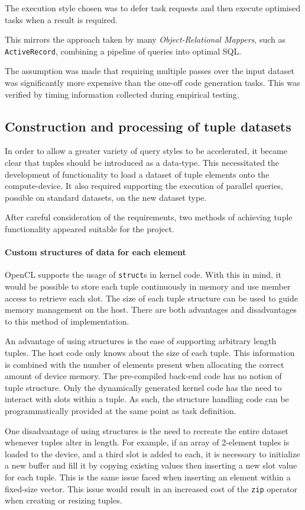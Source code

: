 The execution style chosen was to defer task requests and then execute optimised tasks when a result is required.

This mirrors the approach taken by many \emph{Object-Relational Mappers}, such as \verb|ActiveRecord|, combining a pipeline of queries into optimal SQL.

The assumption was made that requiring multiple passes over the input dataset was significantly more expensive than the one-off code generation tasks. This was verified by timing information collected during empirical testing.

\subsection{Construction and processing of tuple datasets}
In order to allow a greater variety of query styles to be accelerated, it became clear that tuples should be introduced as a data-type. This necessitated the development of functionality to load a dataset of tuple elements onto the compute-device. It also required supporting the execution of parallel queries, possible on standard datasets, on the new dataset type.

After careful consideration of the requirements, two methods of achieving tuple functionality appeared suitable for the project.

\paragraph*{Custom structures of data for each element} \ac{OpenCL} supports the usage of \verb|struct|s in kernel code. With this in mind, it would be possible to store each tuple continuously in memory and use member access to retrieve each slot. The size of each tuple structure can be used to guide memory management on the host. There are both advantages and disadvantages to this method of implementation. 

An advantage of using structures is the ease of supporting arbitrary length tuples. The host code only knows about the size of each tuple. This information is combined with the number of elements present when allocating the correct amount of device memory. The pre-compiled back-end code has no notion of tuple structure. Only the dynamically generated kernel code has the need to interact with slots within a tuple. As such, the structure handling code can be programmatically provided at the same point as task definition. 

One disadvantage of using structures is the need to recreate the entire dataset whenever tuples alter in length. For example, if an array of 2-element tuples is loaded to the device, and a third slot is added to each, it is necessary to initialize a new buffer and fill it by copying existing values then inserting a new slot value for each tuple. This is the same issue faced when inserting an element within a fixed-size vector. This issue would result in an increased cost of the \verb|zip| operator when creating or resizing tuples.

